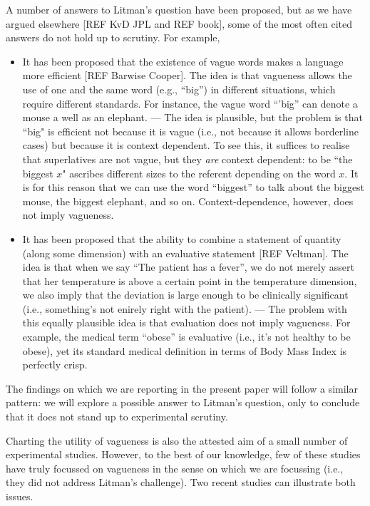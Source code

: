 A number of answers to Litman’s question have been proposed, but as we have argued elsewhere [REF KvD JPL and REF book], some of the most often cited answers do not hold up to scrutiny. For example,
%
\begin{itemize}
\item It has been proposed that the existence of vague words makes a language more efficient [REF Barwise Cooper]. The idea is that vagueness allows the use of one and the same word (e.g., ``big”) in different situations, which require different standards. For instance, the vague word ``’big” can denote a mouse a well as an elephant. — The idea is plausible, but the problem is that ``big" is efficient not because it is vague (i.e., not because it allows borderline cases) but because it is context dependent. To see this, it suffices to realise that superlatives are not vague, but they {\em are} context dependent: to be ``the biggest $x$" ascribes different sizes to the referent depending on the word $x$. It is for this reason that we can use the word ``biggest” to talk about the biggest mouse, the biggest elephant, and so on. Context-dependence, however, does not imply vagueness.
%
\item It has been proposed that the ability to combine a statement of quantity (along some dimension) with an evaluative statement [REF Veltman]. The idea is that when we say “The patient has a fever”, we do not merely assert that her temperature is above a certain point in the temperature dimension, we also imply that the deviation is large enough to be clinically significant (i.e., something’s not enirely right with the patient). — The problem with this equally plausible idea is that evaluation does not imply vagueness. For example, the medical term “obese” is evaluative (i.e., it’s not healthy to be obese), yet its standard medical definition in terms of Body Mass Index is perfectly crisp.
\end{itemize}
%
The findings on which we are reporting in the present paper will follow a similar pattern: we will explore a possible answer to Litman’s question, only to conclude that it does not stand up to experimental scrutiny.

Charting the utility of vagueness is also the attested aim of a small number of experimental studies. However, to the best of our knowledge, few of these studies have truly focussed on vagueness in the sense on which we are focussing (i.e., they did not address Litman's challenge). Two recent studies can illustrate both issues. 

